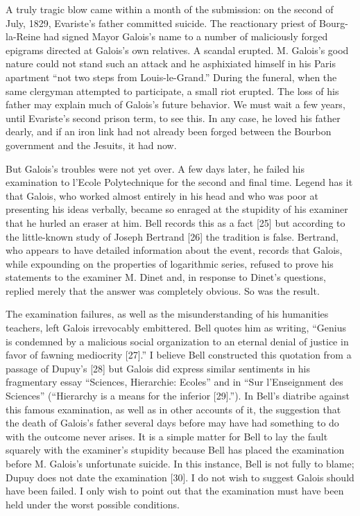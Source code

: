 \documentclass[12pt]{article}
\begin{document}
A truly tragic blow came within a month of the submission: on the second of July, 1829, Evariste's father committed suicide. The reactionary priest of Bourg-la-Reine had signed Mayor Galois's name to a number of maliciously forged epigrams directed at Galois's own relatives. A scandal erupted. M. Galois's good nature could not stand such an attack and he asphixiated himself in his Paris apartment ``not two steps from Louis-le-Grand.'' During the funeral, when the same clergyman attempted to participate, a small riot erupted. The loss of his father may explain much of Galois's future behavior. We must wait a few years, until Evariste's second prison term, to see this. In any case, he loved his father dearly, and if an iron link had not already been forged between the Bourbon government and the Jesuits, it had now.

But Galois's troubles were not yet over. A few days later, he failed his examination to l'Ecole Polytechnique for the second and final time. Legend has it that Galois, who worked almost entirely in his head and who was poor at presenting his ideas verbally, became so enraged at the stupidity of his examiner that he hurled an eraser at him. Bell records this as a fact [25] but according to the little-known study of Joseph Bertrand [26] the tradition is false. Bertrand, who appears to have detailed information about the event, records that Galois, while expounding on the properties of logarithmic series, refused to prove his statements to the examiner M. Dinet and, in response to Dinet's questions, replied merely that the answer was completely obvious. So was the result.

The examination failures, as well as the misunderstanding of his humanities teachers, left Galois irrevocably embittered. Bell quotes him as writing, ``Genius is condemned by a malicious social organization to an eternal denial of justice in favor of fawning mediocrity [27].'' I believe Bell constructed this quotation from a passage of Dupuy's [28] but Galois did express similar sentiments in his fragmentary essay ``Sciences, Hierarchie: Ecoles'' and in ``Sur l'Enseignment des Sciences'' (``Hierarchy is a means for the inferior [29].''). In Bell's diatribe against this famous examination, as well as in other accounts of it, the suggestion that the death of Galois's father several days before may have had something to do with the outcome never arises. It is a simple matter for Bell to lay the fault squarely with the examiner's stupidity because Bell has placed the examination before M. Galois's unfortunate suicide. In this instance, Bell is not fully to blame; Dupuy does not date the examination [30]. I do not wish to suggest Galois should have been failed. I only wish to point out that the examination must have been held under the worst possible conditions.
\end{document}
